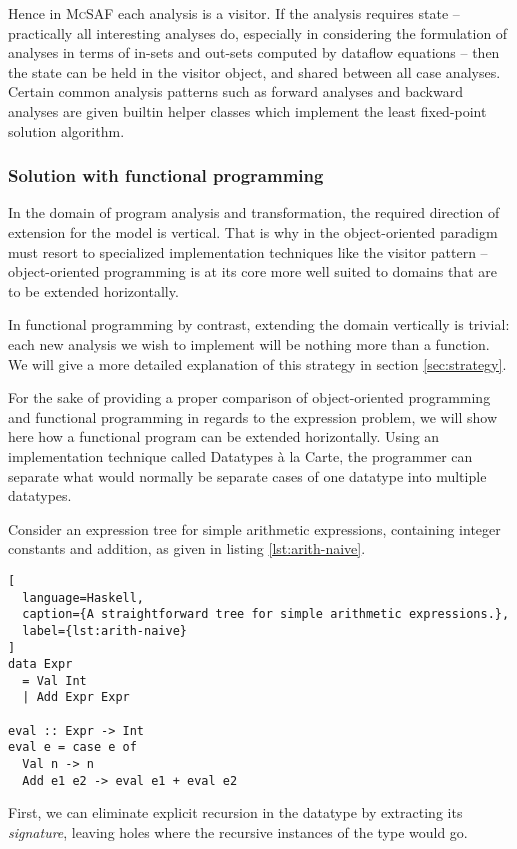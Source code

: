 \documentclass[letterpaper,11pt]{article}
\newcommand{\mcsaf}{\textsc{McSAF}}
\begin{document}
Hence in \mcsaf{} each analysis is a visitor. If the analysis requires state --
practically all interesting analyses do, especially in considering the
formulation of analyses in terms of in-sets and out-sets computed by dataflow
equations -- then the state can be held in the visitor object, and shared
between all case analyses. Certain common analysis patterns such as forward
analyses and backward analyses are given builtin helper classes which
implement the least fixed-point solution algorithm.

\subsubsection{Solution with functional programming}

In the domain of program analysis and transformation, the required direction of
extension for the model is vertical. That is why in the object-oriented
paradigm must resort to specialized implementation techniques like the visitor
pattern -- object-oriented programming is at its core more well suited to
domains that are to be extended horizontally.

In functional programming by contrast, extending the domain vertically is
trivial: each new analysis we wish to implement will be nothing more than a
function. We will give a more detailed explanation of this strategy in section
\ref{sec:strategy}.

For the sake of providing a proper comparison of object-oriented programming
and functional programming in regards to the expression problem, we will show
here how a functional program can be extended horizontally. Using an
implementation technique called Datatypes à la Carte\cite{Swierstra2008}, the
programmer can separate what would normally be separate cases of one datatype
into multiple datatypes.

Consider an expression tree for simple arithmetic expressions, containing
integer constants and addition, as given in listing \ref{lst:arith-naive}.

\begin{lstlisting}[
  language=Haskell,
  caption={A straightforward tree for simple arithmetic expressions.},
  label={lst:arith-naive}
]
data Expr
  = Val Int
  | Add Expr Expr

eval :: Expr -> Int
eval e = case e of
  Val n -> n
  Add e1 e2 -> eval e1 + eval e2
\end{lstlisting}

First, we can eliminate explicit recursion in the datatype by extracting its
\emph{signature}, leaving holes where the recursive instances of the type would
go.
\end{document}
